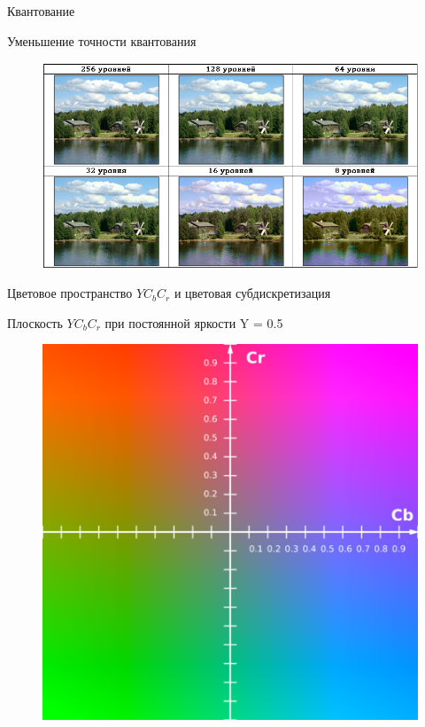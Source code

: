 \documentclass[11pt]{beamer}
\begin{document}
\begin{frame}{Квантование}
\begin{block}{Уменьшение точности квантования}
\begin{figure}[H]
	\begin{center}
		\includegraphics[scale=0.5]{../pics/quantization/levels_of_quantization.png}
	\end{center}
\end{figure}	
\end{block}				
\end{frame}



\begin{frame}{Цветовое пространство $YC_bC_r$ и цветовая субдискретизация}
\begin{block}{Плоскость $YC_bC_r$ при постоянной яркости Y = 0.5}
\begin{figure}[H]
	\begin{center}
		\includegraphics[scale=0.5]{../pics/YCbCr/YCbCr.png}
	\end{center}
\end{figure}	
\end{block}			
\end{frame}
\end{document}
